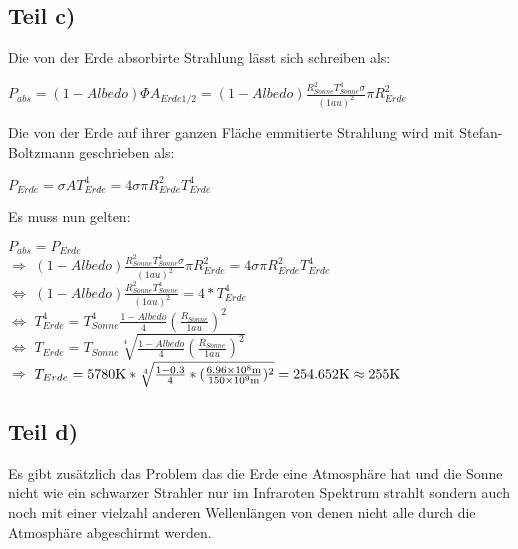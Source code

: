\subsection{Teil c)}
Die von der Erde absorbirte Strahlung lässt sich schreiben als:
\begin{center}
    $P_{abs}=(1-Albedo)\Phi A_{Erde1/2}=(1-Albedo)\frac{R^2_{Sonne}T^4_{Sonne}\sigma}{(1au)^2}\pi R^2_{Erde}$
\end{center}
Die von der Erde auf ihrer ganzen Fläche emmitierte Strahlung wird mit Stefan-Boltzmann geschrieben als:
\begin{center}
    $P_{Erde}=\sigma AT^4_{Erde}=4\sigma\pi R^2_{Erde}T^4_{Erde}$
\end{center}
Es muss nun gelten:
\begin{center}
    $P_{abs}=P_{Erde}$\\
    $\Rightarrow$ $(1-Albedo)\frac{R^2_{Sonne}T^4_{Sonne}\sigma}{(1au)^2}\pi R^2_{Erde}=4\sigma\pi R^2_{Erde}T^4_{Erde}$\\
    $\Leftrightarrow$ $(1-Albedo)\frac{R^2_{Sonne}T^4_{Sonne}}{(1au)^2}=4*T^4_{Erde}$\\
    $\Leftrightarrow$ $T^4_{Erde}=T^4_{Sonne}\frac{1-Albedo}{4}(\frac{R_{Sonne}}{1au})^2$\\
    $\Leftrightarrow$ $T_{Erde}=T_{Sonne} \sqrt[4]{\frac{1-Albedo}{4}(\frac{R_{Sonne}}{1au})^2}$\\
    $\Rightarrow$ $T_{Erde}=5780\si[]{K}*\sqrt[4]{\frac{1-0.3}{4}*(\frac{6.96\times 10^8\si[]{m}}{150 \times 10^9\si[]{m}})^2}=254.652\si[]{K}\approx 255\si[]{K}$
\end{center}

\subsection{Teil d)}
Es gibt zusätzlich das Problem das die Erde eine Atmosphäre hat und die Sonne nicht wie ein schwarzer Strahler nur im Infraroten Spektrum strahlt sondern auch noch mit einer
vielzahl anderen Wellenlängen von denen nicht alle durch die Atmosphäre abgeschirmt werden.